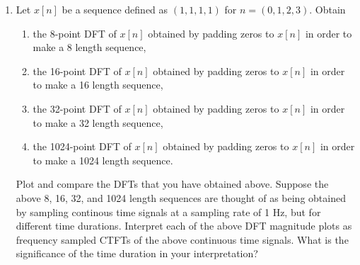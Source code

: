 \begin{enumerate}
\item Let $x[n]$ be a sequence defined as $(1,1,1,1)$ for $n = (0, 1, 2, 3)$. Obtain
  \begin{enumerate}
  \item the 8-point DFT of $x[n]$ obtained by padding zeros to $x[n]$ in order to make a 8 length sequence,
  \item the 16-point DFT of $x[n]$ obtained by padding zeros to $x[n]$ in order to make a 16 length sequence,
  \item the 32-point DFT of $x[n]$ obtained by padding zeros to $x[n]$ in order to make a 32 length sequence,
  \item the 1024-point DFT of $x[n]$ obtained by padding zeros to $x[n]$ in order to make a 1024 length sequence.
  \end{enumerate}
  Plot and compare the DFTs that you have obtained above.
  Suppose the above 8, 16, 32, and 1024 length sequences are thought of as being obtained by sampling continous time signals at a sampling rate of 1 Hz, but for different time durations.
  Interpret each of the above DFT magnitude plots as frequency sampled CTFTs of the above continuous time signals.
  What is the significance of the time duration in your interpretation?


\end{enumerate}

